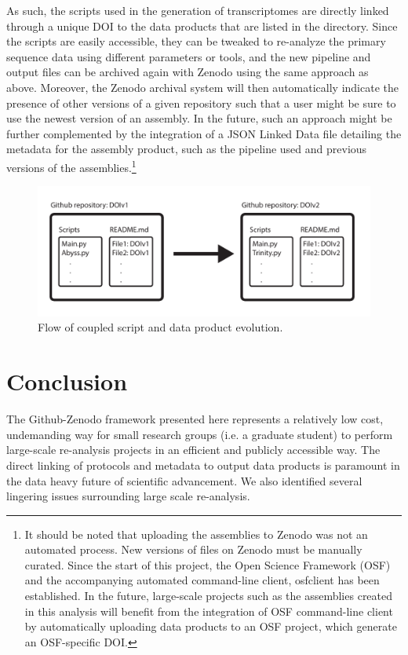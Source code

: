 \documentclass[a4paper,num-refs]{oup-contemporary}
\begin{document}
As such, the scripts used in the generation of transcriptomes are
directly linked through a unique DOI to the data products that are
listed in the directory. Since the scripts are easily accessible, they
can be tweaked to re-analyze the primary sequence data using different
parameters or tools, and the new pipeline and output files can be
archived again with Zenodo using the same approach as above.
Moreover, the Zenodo archival system will then automatically indicate
the presence of other versions of a given repository such that a user
might be sure to use the newest version of an assembly. In the future,
such an approach might be further complemented by the integration of a
JSON Linked Data file detailing the metadata for the assembly product,
such as the pipeline used and previous versions of the assemblies.\footnote{It should be noted that uploading the assemblies to Zenodo was not an automated process. New versions of files on Zenodo must be manually curated. Since the start of this project, the Open Science Framework (OSF) and the accompanying automated command-line client, osfclient has been established. In the future, large-scale projects such as the assemblies created in this analysis will benefit from the integration of OSF command-line client by automatically uploading data products to an OSF project, which generate an OSF-specific DOI.}

\begin{figure}
  \centering
  \includegraphics[width=\linewidth]{Diagram.pdf}
  \caption{Flow of coupled script and data product evolution.}
  \label{fig:FlowDiagram}
\end{figure}
\section{Conclusion}

The Github-Zenodo framework presented here represents a relatively low
cost, undemanding way for small research groups (i.e. a graduate
student) to perform large-scale re-analysis projects in an efficient
and publicly accessible way. The direct linking of protocols and
metadata to output data products is paramount in the data heavy future
of scientific advancement. We also identified several lingering issues surrounding large scale
re-analysis.
\end{document}
